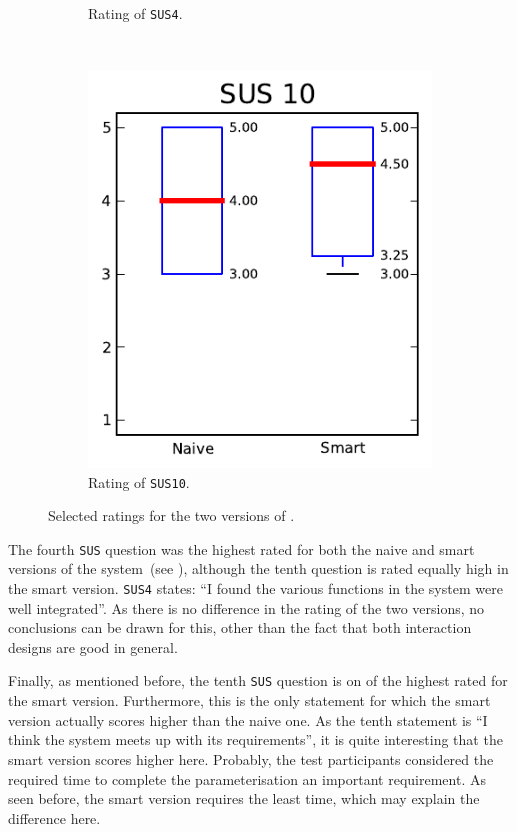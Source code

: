 \begin{figure}[h!]
\begin{subfigure}[t]{0.32\textwidth}
\caption{Rating of \texttt{SUS4}.}
\end{subfigure}%
~
\begin{subfigure}[t]{0.32\textwidth}
\centering
\includegraphics[width=\textwidth]{img/graphs/4a_09.pdf}
\caption{Rating of \texttt{SUS10}.}
\end{subfigure}
\caption{Selected ratings for the two versions of \oframp.}
\end{figure}

The fourth \verb|SUS| question was the highest rated for both the naive and smart versions of the system~(see ), although the tenth question is rated equally high in the smart version. \verb|SUS4| states: ``I found the various functions in the system were well integrated''. As there is no difference in the rating of the two versions, no conclusions can be drawn for this, other than the fact that both interaction designs are good in general.

Finally, as mentioned before, the tenth \verb|SUS| question is on of the highest rated for the smart version. Furthermore, this is the only statement for which the smart version actually scores higher than the naive one. As the tenth statement is ``I think the system meets up with its requirements'', it is quite interesting that the smart version scores higher here. Probably, the test participants considered the required time to complete the parameterisation an important requirement. As seen before, the smart version requires the least time, which may explain the difference here.


